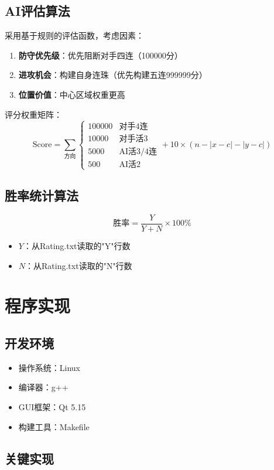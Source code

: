 \documentclass[UTF8]{ctexart}
\begin{document}
\subsection{AI评估算法}
采用基于规则的评估函数，考虑因素：
\begin{enumerate}
    \item \textbf{防守优先级}：优先阻断对手四连（100000分）
    \item \textbf{进攻机会}：构建自身连珠（优先构建五连999999分）
    \item \textbf{位置价值}：中心区域权重更高
\end{enumerate}

评分权重矩阵：
\[
\text{Score} = \sum_{\text{方向}} \begin{cases} 
100000 & \text{对手4连} \\
10000 & \text{对手活3} \\
5000 & \text{AI活3/4连} \\
500 & \text{AI活2}
\end{cases} + 10 \times (n - |x - c| - |y - c|)
\]

\subsection{胜率统计算法}
\[
\text{胜率} = \frac{Y}{Y + N} \times 100\%
\]
\begin{itemize}
    \item $Y$：从Rating.txt读取的"Y"行数
    \item $N$：从Rating.txt读取的"N"行数
\end{itemize}

\section{程序实现}
\subsection{开发环境}
\begin{itemize}
    \item 操作系统：Linux
    \item 编译器：g++
    \item GUI框架：Qt 5.15
    \item 构建工具：Makefile
\end{itemize}

\subsection{关键实现}
\end{document}
